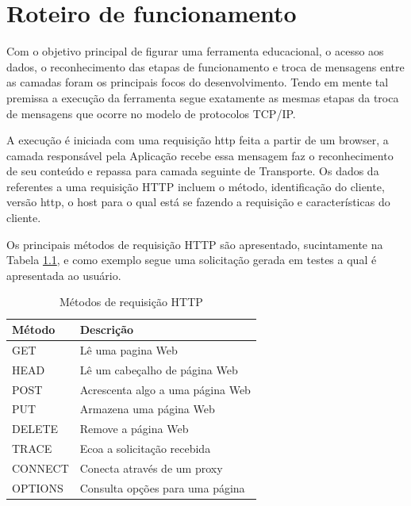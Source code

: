 
\chapter{Roteiro de funcionamento}
\label{chap:Roteiro}
Com o objetivo principal de figurar uma ferramenta educacional, o acesso aos dados, o reconhecimento das etapas de funcionamento e troca de mensagens entre as camadas foram os principais focos do desenvolvimento. Tendo em mente tal premissa a execução da ferramenta segue exatamente as mesmas etapas da troca de mensagens que ocorre no modelo de protocolos TCP/IP.

A execuç\~ao \'e iniciada com uma requisiç\~ao http feita a partir de um browser, a camada responsável pela Aplicação recebe essa mensagem faz o reconhecimento de seu conteúdo e repassa para camada seguinte de Transporte. Os dados da referentes a uma requisição HTTP incluem o método, identificação do cliente, versão http, o host para o qual está se fazendo a requisição e características do cliente.

Os principais métodos de requisição HTTP são apresentado, sucintamente na Tabela \ref{tab:requisicoesHTTP}, e como exemplo segue uma solicitação gerada em testes a qual é apresentada ao usuário.

\begin{table}[H]
	\small
	\begin{tabular}{ |p{2cm}||p{7cm}| }
		\hline
		Método & Descrição\\
		\hline 
		GET   	& Lê uma pagina Web\\
		HEAD	& Lê um cabeçalho de página Web\\
		POST 	& Acrescenta algo a uma página Web\\
		PUT    	& Armazena uma página Web\\
		DELETE	& Remove a página Web\\
		TRACE	& Ecoa a solicitação recebida\\
		CONNECT & Conecta através de um proxy\\
		OPTIONS & Consulta opções para uma página\\
		\hline
	\end{tabular}
	\label {tab:requisicoesHTTP}
	\centering
	\caption {Métodos de requisição HTTP}
	\cite{TANENBAUM}
\end{table}

